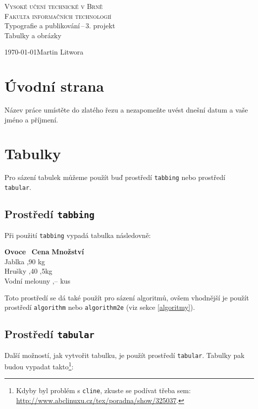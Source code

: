 \documentclass[a4paper,11pt]{article}
\begin{document}
\begin{titlepage}
\begin{center}
\Huge
\textsc{Vysoké učení technické v Brně}\\
\textsc{Fakulta informačních technologií}\\
\huge
Typografie a publikování\,--\,3. projekt\\
\Huge
Tabulky a obrázky\\
\end{center}
{\LARGE \today \hfill Martin Litwora}
\end{titlepage}


\section{Úvodní strana}
Název práce umístěte do zlatého řezu a nezapomeňte uvést dnešní datum a vaše jméno a příjmení.

\section{Tabulky}
Pro sázení tabulek můžeme použít buď prostředí \texttt{tabbing} nebo prostředí \texttt{tabular}.

\subsection{Prostředí \texttt{tabbing}}
Při použití \texttt{tabbing} vypadá tabulka následovně:
\begin{tabbing}
\textbf{Ovoce}  \qquad \qquad \ \= \textbf{Cena} \quad \= \textbf{Množství} \\
Jablka ,90  kg \\
Hrušky ,40 ,5kg\\
Vodní melouny ,--  kus
\end{tabbing}
Toto prostředí se dá také použít pro sázení algoritmů, ovšem vhodnější je použít prostředí \texttt{algorithm} nebo \texttt{algorithm2e} (viz sekce \ref{algoritmy}).

\subsection{Prostředí \texttt{tabular}}
Další možností, jak vytvořit tabulku, je použít prostředí \texttt{tabular}. Tabulky pak budou vypadat takto\footnote{Kdyby byl problém s \texttt{cline}, zkuste se podívat třeba sem: \url{http://www.abclinuxu.cz/tex/poradna/show/325037}.}:
\end{document}
